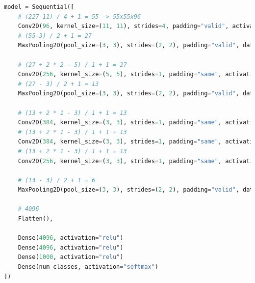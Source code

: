 \begin{lstlisting}[language=Python]
model = Sequential([
	# (227-11) / 4 + 1 = 55 -> 55x55x96
	Conv2D(96, kernel_size=(11, 11), strides=4, padding="valid", activation="relu", input_shape=input_shape),
	# (55-3) / 2 + 1 = 27
	MaxPooling2D(pool_size=(3, 3), strides=(2, 2), padding="valid", data_format=None)

	# (27 + 2 * 2 - 5) / 1 + 1 = 27
	Conv2D(256, kernel_size=(5, 5), strides=1, padding="same", activation="relu", kernel_initializer="he_normal")
	# (27 - 3) / 2 + 1 = 13
	MaxPooling2D(pool_size=(3, 3), strides=(2, 2), padding="valid", data_format=None)

	# (13 + 2 * 1 - 3) / 1 + 1 = 13
	Conv2D(384, kernel_size=(3, 3), strides=1, padding="same", activation="relu", kernel_initializer="he_normal")
	# (13 + 2 * 1 - 3) / 1 + 1 = 13
	Conv2D(384, kernel_size=(3, 3), strides=1, padding="same", activation="relu", kernel_initializer="he_normal")
	# (13 + 2 * 1 - 3) / 1 + 1 = 13
	Conv2D(256, kernel_size=(3, 3), strides=1, padding="same", activation="relu", kernel_initializer="he_normal")

	# (13 - 3) / 2 + 1 = 6
	MaxPooling2D(pool_size=(3, 3), strides=(2, 2), padding="valid", data_format=None)

	# 4096
	Flatten(),

	Dense(4096, activation="relu")
	Dense(4096, activation="relu")
	Dense(1000, activation="relu")
	Dense(num_classes, activation="softmax")
])
\end{lstlisting}

\newpage